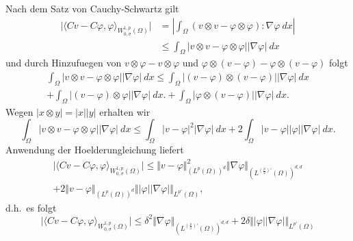 \documentclass{article}
\begin{document}
Nach dem Satz von Cauchy-Schwartz gilt
\begin{equation*}
  \begin{aligned}
    \vert \langle Cv - C \varphi , \varphi \rangle_{W_{0, \sigma}^{1,p} (\Omega)} \vert
    &= \left\vert \int_{\Omega}^{} (v \otimes v - \varphi \otimes \varphi) : \nabla \varphi \ dx \right\vert \\
    &\leq \int_{\Omega}^{} \vert v \otimes v - \varphi \otimes \varphi \vert \vert \nabla \varphi \vert \ dx
  \end{aligned}
\end{equation*}
und durch Hinzufuegen von $v \otimes \varphi - v \otimes \varphi$ und $\varphi \otimes (v - \varphi) - \varphi \otimes (v - \varphi)$ folgt
\begin{multline*}
  \int_{\Omega}^{} \vert v \otimes v - \varphi \otimes \varphi \vert \vert \nabla \varphi \vert \ dx
  \leq   \int_{\Omega}^{} \vert (v - \varphi) \otimes (v - \varphi) \vert \vert \nabla \varphi \vert \ dx \\
  + \int_{\Omega}^{} \vert (v - \varphi) \otimes \varphi \vert  \vert \nabla \varphi \vert \ dx.
  + \int_{\Omega}^{} \vert \varphi \otimes (v - \varphi) \vert  \vert \nabla \varphi \vert \ dx.
\end{multline*}
Wegen $\vert x \otimes y \vert = \vert x \vert \vert y \vert$ erhalten wir
\begin{equation*}
  \int_{\Omega}^{} \vert v \otimes v - \varphi \otimes \varphi \vert \vert \nabla \varphi \vert \ dx
  \leq   \int_{\Omega}^{} \vert v - \varphi \vert^2 \vert \nabla \varphi \vert \ dx
  + 2 \int_{\Omega}^{} \vert  v - \varphi \vert \vert \varphi \vert \vert \nabla \varphi \vert \ dx.
\end{equation*}
Anwendung der Hoelderungleichung liefert
\begin{multline*}
  \vert \langle Cv - C \varphi , \varphi \rangle_{W_{0, \sigma}^{1,p} (\Omega)} \vert
  \leq \Vert v - \varphi \Vert_{(L^p(\Omega))^{d}}^2 \Vert \nabla \varphi \Vert_{(L^{\left(\frac{p}{2}\right)'}(\Omega))^{d,d}} \\
  + 2 \Vert v - \varphi \Vert_{(L^p(\Omega))^d}\Vert \vert \varphi \vert \vert \nabla \varphi \vert \Vert_{L^{p'}(\Omega)},
\end{multline*}
d.h.\ es folgt
\begin{equation*}
  \vert \langle Cv - C \varphi , \varphi \rangle_{W_{0, \sigma}^{1,p} (\Omega)} \vert
  \leq \delta^2 \Vert \nabla \varphi \Vert_{(L^{\left(\frac{p}{2}\right)'}(\Omega))^{d,d}}
  + 2 \delta \Vert \vert \varphi \vert \vert \nabla \varphi \vert \Vert_{L^{p'}(\Omega)}
\end{equation*}
\end{document}

